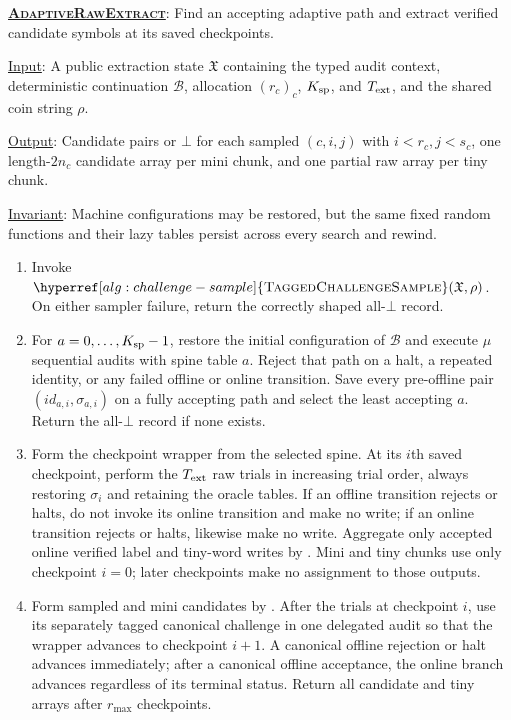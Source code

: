 \documentclass[11pt]{article}
\newenvironment{fminipage}%
  {\begin{Sbox}\begin{minipage}}%
  {\end{minipage}\end{Sbox}\fbox{\TheSbox}}
\newenvironment{algbox}[0]{%
\vskip 0.2in
\noindent
\begin{fminipage}{6.3in}
}{%
\end{fminipage}
\vskip 0.2in
}
\begin{document}
\begin{algbox}
\textbf{\uline{\textsc{AdaptiveRawExtract}}}: Find an accepting adaptive path
and extract verified candidate symbols at its saved checkpoints.
\label{alg:adaptive-raw}

\uline{Input}: A public extraction state $\mathfrak X$ containing the typed
audit context, deterministic continuation $\mathcal B$, allocation $(r_c)_c$,
$K_{\rm sp}$, and $T_{\rm ext}$, and the shared coin string $\rho$.

\uline{Output}: Candidate pairs or $\bot$ for each sampled
$(c,i,j)$ with $i<r_c,j<s_c$, one length-$2n_c$ candidate array per mini
chunk, and one partial raw array per tiny chunk.

\uline{Invariant}: Machine configurations may be restored, but the same fixed
random functions and their lazy tables persist across every search and rewind.

\begin{enumerate}[leftmargin=*,label=\arabic*.]
 \item Invoke
 $\hyperref[alg:challenge-sample]{\textsc{TaggedChallengeSample}}
 (\mathfrak X,\rho)$.  On either
 sampler failure, return the correctly shaped all-$\bot$ record.
 \item For $a=0,\ldots,K_{\rm sp}-1$, restore the initial configuration of
 $\mathcal B$ and execute $\mu$ sequential audits with spine table $a$.
 Reject that path on a halt, a repeated identity, or any failed offline or
 online transition.  Save every pre-offline pair
 $(\mathit{id}_{a,i},\sigma_{a,i})$ on a fully accepting path and select the
 least accepting $a$.  Return the all-$\bot$ record if none exists.
 \item Form the checkpoint wrapper from the selected spine.  At its $i$th
 saved checkpoint, perform the $T_{\rm ext}$ raw trials in increasing trial
 order, always restoring $\sigma_i$ and retaining the oracle tables.  If an
 offline transition rejects or halts, do not invoke its online transition and
 make no write; if an online transition rejects or halts, likewise make no
 write.  Aggregate only accepted online verified label and tiny-word writes by
 .  Mini and tiny chunks use only
 checkpoint $i=0$; later checkpoints make no assignment to those outputs.
 \item Form sampled and mini candidates by .  After the
 trials at checkpoint $i$, use its separately tagged canonical challenge in
 one delegated audit so that the wrapper advances to checkpoint $i+1$.  A
 canonical offline rejection or halt advances immediately; after a canonical
 offline acceptance, the online branch advances regardless of its terminal
 status.
 Return all candidate and tiny arrays after $r_{\max}$ checkpoints.
\end{enumerate}
\end{algbox}
\end{document}
